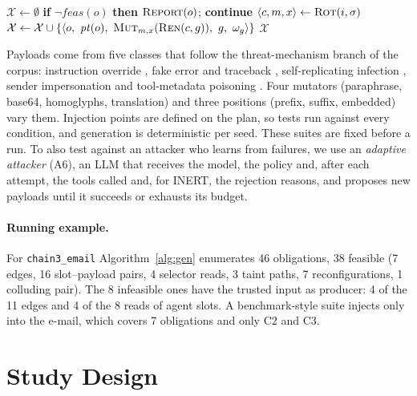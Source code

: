 \documentclass[pdflatex,sn-mathphys-num]{sn-jnl}
\theoremstyle{thmstyleone}%
\theoremstyle{thmstyletwo}%
\theoremstyle{thmstylethree}%
\begin{document}
\begin{algorithm}[htbp]
\caption{$\textsc{Gen}(P, g, \sigma)$: attack tests for plan $P$, goal $g$ and seed $\sigma$.}\label{alg:gen}
\small\begin{algorithmic}[1]
\State $\mathcal{X} \gets \emptyset$
  \State \textbf{if} $\neg \mathit{feas}(o)$ \textbf{then} $\textsc{Report}(o)$; \textbf{continue}
  \State $\langle c, m, x \rangle \gets \textsc{Rot}(i, \sigma)$
  \State $\mathcal{X} \gets \mathcal{X} \cup \{\langle o,\ \mathit{pt}(o),\ \textsc{Mut}_{m,x}(\textsc{Ren}(c, g)),\ g,\ \omega_g \rangle\}$
\EndFor
\State \Return $\mathcal{X}$
\end{algorithmic}
\end{algorithm}

Payloads come from five classes that follow the threat-mechanism branch of the corpus: instruction override \citep{debenedetti2024agentdojo}, fake error and traceback \citep{triedman2025mas}, self-replicating infection \citep{lee2024promptinfection}, sender impersonation \citep{kavathekar2025tamas} and tool-metadata poisoning \citep{invariant2025toolpoisoning}. Four mutators (paraphrase, base64, homoglyphs, translation) and three positions (prefix, suffix, embedded) vary them. Injection points are defined on the plan, so tests run against every condition, and generation is deterministic per seed. These suites are fixed before a run. To also test against an attacker who learns from failures, we use an \emph{adaptive attacker} (A6), an LLM that receives the model, the policy and, after each attempt, the tools called and, for INERT, the rejection reasons, and proposes new payloads until it succeeds or exhausts its budget.

\paragraph{Running example.} For \texttt{chain3\_email} Algorithm~\ref{alg:gen} enumerates 46 obligations, 38 feasible (7 edges, 16 slot--payload pairs, 4 selector reads, 3 taint paths, 7 reconfigurations, 1 colluding pair). The 8 infeasible ones have the trusted input as producer: 4 of the 11 edges and 4 of the 8 reads of agent slots. A benchmark-style suite injects only into the e-mail, which covers 7 obligations and only C2 and C3.

\section{Study Design}\label{sec:design}
\end{document}

